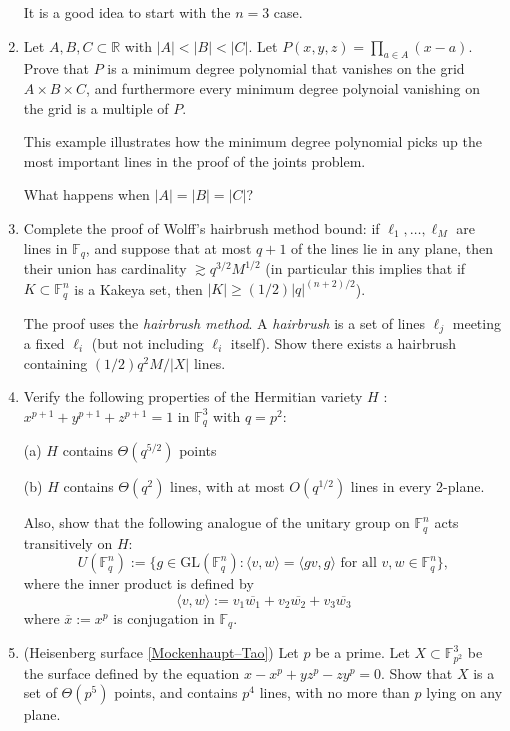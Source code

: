 \documentclass{article}
\newcommand{\FF}{\mathbb{F}}
\newcommand{\RR}{\mathbb{R}}
\begin{document}
\begin{enumerate}
It is a good idea to start with the $n=3$ case.

\item

Let $A,B,C \subset \RR$ with $|A|<|B|<|C|$. Let $P(x,y,z) = \prod_{a \in A} (x-a)$. Prove that $P$ is a minimum degree polynomial that vanishes on the grid $A \times B\times C$, and furthermore every minimum degree polynoial vanishing on the grid is a multiple of $P$.

This example illustrates how the minimum degree polynomial picks up the most important lines in the proof of the joints problem.

What happens when $|A| = |B| = |C|$?


\item

Complete the proof of Wolff's hairbrush method bound: if $\ell_1, \dots, \ell_M$ are lines in $\FF_q$, and suppose that at most $q+1$ of the lines lie in any plane, then their union has cardinality $\gtrsim q^{3/2}M^{1/2}$ (in particular this implies that if $K \subset \FF_q^n$ is a Kakeya set, then $|K| \ge (1/2)|q|^{(n+2)/2}$).

The proof uses the \emph{hairbrush method}. A \emph{hairbrush} is a set of lines $\ell_j$ meeting a fixed $\ell_i$ (but not including $\ell_i$ itself). Show there exists a hairbrush containing $(1/2)q^2M/|X|$ lines.

\item

Verify the following properties of the Hermitian variety $H$ : $x^{p+1} + y^{p+1} + z^{p+1} = 1$ in $\FF_q^3$ with $q = p^2$:

(a) $H$ contains $\Theta(q^{5/2})$ points

(b) $H$ contains $\Theta(q^2)$ lines, with at most $O(q^{1/2})$ lines in every 2-plane.

Also, show that the following analogue of the unitary group on $\FF_q^n$ acts transitively on $H$:
\[U(\FF_q^n) := \{ g \in \mathrm{GL}(\FF_q^n) : \langle v,w \rangle = \langle
gv, g \rangle \text{ for all } v,w \in \FF_q^n \},
\]
where the inner product is defined by
\[
\langle v,w\rangle := v_1 \overline{w_1} + v_2 \overline{w_2} +  v_3 \overline{w_3}
\]
where $\overline{x} := x^p$ is conjugation in $\FF_q$.

\item
(Heisenberg surface \href{http://arxiv.org/abs/math/0204234}{{[Mockenhaupt--Tao]}}) Let $p$ be a prime. Let $X \subset \FF_{p^2}^3$ be the surface defined by the equation $x - x^p + yz^p - zy^p = 0$. Show that $X$ is a set of $\Theta(p^5)$ points, and contains $p^4$ lines, with no more than $p$ lying on any plane.


\end{enumerate}
\end{document}
